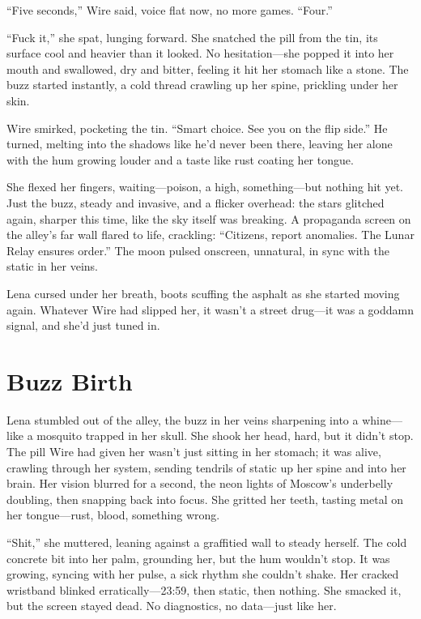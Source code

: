 \documentclass[12pt]{book}
\begin{document}
``Five seconds,'' Wire said, voice flat now, no more games. ``Four.''

``Fuck it,'' she spat, lunging forward. She snatched the pill from the tin, its surface cool and heavier than it looked. No hesitation---she popped it into her mouth and swallowed, dry and bitter, feeling it hit her stomach like a stone. The buzz started instantly, a cold thread crawling up her spine, prickling under her skin.

Wire smirked, pocketing the tin. ``Smart choice. See you on the flip side.'' He turned, melting into the shadows like he'd never been there, leaving her alone with the hum growing louder and a taste like rust coating her tongue.

She flexed her fingers, waiting---poison, a high, something---but nothing hit yet. Just the buzz, steady and invasive, and a flicker overhead: the stars glitched again, sharper this time, like the sky itself was breaking. A propaganda screen on the alley's far wall flared to life, crackling: ``Citizens, report anomalies. The Lunar Relay ensures order.'' The moon pulsed onscreen, unnatural, in sync with the static in her veins.

Lena cursed under her breath, boots scuffing the asphalt as she started moving again. Whatever Wire had slipped her, it wasn't a street drug---it was a goddamn signal, and she'd just tuned in.

\section{Buzz Birth}

Lena stumbled out of the alley, the buzz in her veins sharpening into a whine---like a mosquito trapped in her skull. She shook her head, hard, but it didn’t stop. The pill Wire had given her wasn’t just sitting in her stomach; it was alive, crawling through her system, sending tendrils of static up her spine and into her brain. Her vision blurred for a second, the neon lights of Moscow’s underbelly doubling, then snapping back into focus. She gritted her teeth, tasting metal on her tongue---rust, blood, something wrong.

``Shit,'' she muttered, leaning against a graffitied wall to steady herself. The cold concrete bit into her palm, grounding her, but the hum wouldn’t stop. It was growing, syncing with her pulse, a sick rhythm she couldn’t shake. Her cracked wristband blinked erratically---23:59, then static, then nothing. She smacked it, but the screen stayed dead. No diagnostics, no data---just like her.
\end{document}
